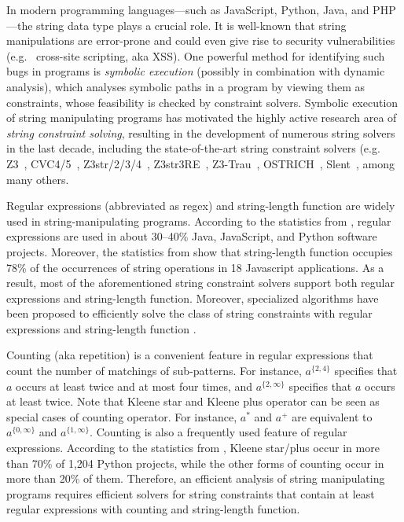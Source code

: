 %

In modern programming languages---such as JavaScript, Python, Java, and PHP---the string data type plays a crucial role. 
It is well-known that string manipulations are error-prone and could even give rise to security vulnerabilities (e.g. \ cross-site scripting, aka XSS). 
One powerful method for identifying such bugs in programs is \emph{symbolic execution} (possibly in combination with dynamic analysis), which analyses symbolic paths in a program by viewing them as constraints, whose feasibility is checked by constraint solvers. 
%
Symbolic execution of string manipulating programs has motivated the highly active research area of \emph{string constraint solving}, resulting in the development of numerous string solvers in the last decade, including the state-of-the-art string constraint solvers (e.g.
Z3~\cite{Z3}, CVC4/5~\cite{cvc4}, Z3str/2/3/4~\cite{Z3-str,Z3-str2,Z3-str3,BerzishMurphy2021}, Z3str3RE~\cite{BD+23}, 
Z3-Trau~\cite{Z3-trau}, OSTRICH~\cite{CHL+19}, Slent~\cite{WC+18}, among many others. 

Regular expressions (abbreviated as regex) and string-length function are widely used in string-manipulating programs. According to the statistics from \cite{CS16,DCSL18,WS18}, regular expressions are used in about 30–40\% Java, JavaScript, and Python software projects. 
Moreover, the statistics from \cite{malware_detection_3_kudzu} show that string-length function occupies 78\% of the occurrences of string operations in 18 Javascript applications. 
As a result, most of the aforementioned string constraint solvers support both regular expressions and string-length function. Moreover, specialized algorithms have been proposed to efficiently solve the class of string constraints with regular expressions and string-length function \cite{LTR+15,BD+23}. 

Counting (aka repetition) is a convenient feature in regular expressions that count the number of matchings of sub-patterns. For instance, $a^{\{2, 4\}}$ specifies that $a$ occurs at least twice and at most four times, and $a^{\{2, \infty\}}$ specifies that $a$ occurs at least twice. 
Note that Kleene star and Kleene plus operator can be seen as special cases of counting operator. For instance, $a^*$ and $a^+$ are equivalent to $a^{\{0,\infty\}}$ and $a^{\{1,\infty\}}$.
Counting is also a frequently used feature of regular expressions. According to the statistics from \cite{CS16}, Kleene star/plus occur in more than 70\% of 1,204 Python projects, while the other forms of counting occur in more than 20\% of them. Therefore, an efficient analysis of string manipulating programs requires efficient solvers for string constraints that contain at least regular expressions with counting and string-length function. 

